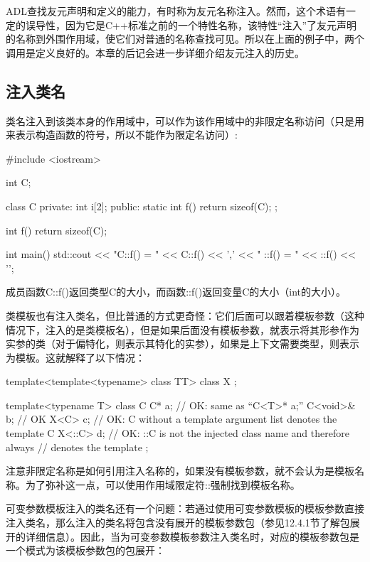ADL查找友元声明和定义的能力，有时称为友元名称注入。然而，这个术语有一定的误导性，因为它是C++标准之前的一个特性名称，该特性“注入”了友元声明的名称到外围作用域，使它们对普通的名称查找可见。所以在上面的例子中，两个调用是定义良好的。本章的后记会进一步详细介绍友元注入的历史。

\subsection{注入类名}

类名注入到该类本身的作用域中，可以作为该作用域中的非限定名称访问（只是用来表示构造函数的符号，所以不能作为限定名访问）:

\begin{cpp}
#include <iostream>

int C;

class C {
private:
	int i[2];
public:
	static int f() {
		return sizeof(C);
	}
};

int f()
{
	return sizeof(C);
}

int main()
{
	std::cout << "C::f() = " << C::f() << ','
	<< " ::f() = " << ::f() << '\n';
}
\end{cpp}

成员函数C::f()返回类型C的大小，而函数::f()返回变量C的大小（int的大小）。

类模板也有注入类名，但比普通的方式更奇怪：它们后面可以跟着模板参数（这种情况下，注入的是类模板名），但是如果后面没有模板参数，就表示将其形参作为实参的类（对于偏特化，则表示其特化的实参），如果是上下文需要类型，则表示为模板。这就解释了以下情况：

\begin{cpp}
template<template<typename> class TT> class X {
};

template<typename T> class C {
	C* a; // OK: same as “C<T>* a;”
	C<void>& b; // OK
	X<C> c; // OK: C without a template argument list denotes the template C
	X<::C> d; // OK: ::C is not the injected class name and therefore always
			  // denotes the template
};
\end{cpp}

注意非限定名称是如何引用注入名称的，如果没有模板参数，就不会认为是模板名称。为了弥补这一点，可以使用作用域限定符::强制找到模板名称。

可变参数模板注入的类名还有一个问题：若通过使用可变参数模板的模板参数直接注入类名，那么注入的类名将包含没有展开的模板参数包（参见12.4.1节了解包展开的详细信息）。因此，当为可变参数模板参数注入类名时，对应的模板参数包是一个模式为该模板参数包的包展开：


